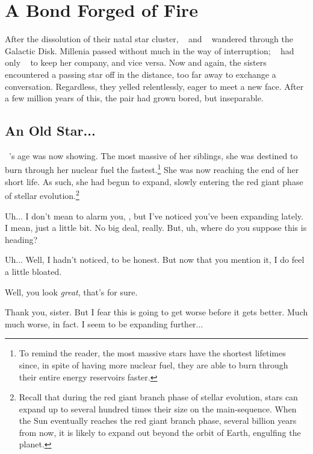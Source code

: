 \documentclass[main.tex]{subfiles}
\begin{document}
\chapter{A Bond Forged of Fire}

\par \nar After the dissolution of their natal star cluster, \rmmaia~ and \rmmerope~ wandered through the Galactic Disk.  Millenia passed without much in the way of interruption; \rmmaia~ had only \rmmerope~ to keep her company, and vice versa.  Now and again, the sisters encountered a passing star off in the distance, too far away to exchange a conversation.  Regardless, they yelled relentlessly, eager to meet a new face.  After a few million years of this, the pair had grown bored, but inseparable.

\section{An Old Star...}

\par \nar \rmmerope~'s age was now showing.  The most massive of her siblings, she was destined to burn through her nuclear fuel the fastest.\footnote{To remind the reader, the most massive stars have the shortest lifetimes since, in spite of having more nuclear fuel, they are able to burn through their entire energy reservoirs faster.}  She was now reaching the end of her short life.  As such, she had begun to expand, slowly entering the red giant phase of stellar evolution.\footnote{Recall that during the red giant branch phase of stellar evolution, stars can expand up to several hundred times their size on the main-sequence.  When the Sun eventually reaches the red giant branch phase, several billion years from now, it is likely to expand out beyond the orbit of Earth, engulfing the planet.}  

\par \Maia Uh... I don't mean to alarm you, \rmmerope, but I've noticed you've been expanding lately.  I mean, just a little bit.  No big deal, really.  But, uh, where do you suppose this is heading?

\par \Merope Uh... Well, I hadn't noticed, to be honest.  But now that you mention it, I do feel a little bloated.  

\par \Maia Well, you look \textit{great}, that's for sure.

\par \Merope Thank you, sister.  But I fear this is going to get worse before it gets better.  Much much worse, in fact.  I seem to be expanding further...
\end{document}
